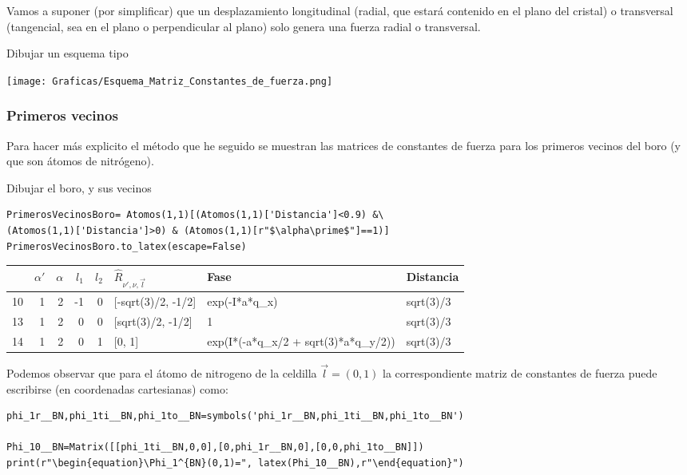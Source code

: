 \documentclass[12pt,a4paper]{article}
\begin{document}
Vamos a suponer (por simplificar) que un desplazamiento longitudinal (radial, que estará contenido en el plano del cristal) o transversal (tangencial, sea en el plano o perpendicular al plano) solo genera una fuerza radial o transversal.

\color{red}
Dibujar un esquema tipo
\begin{center}
\texttt{[image: Graficas/Esquema\_Matriz\_Constantes\_de\_fuerza.png]}
\end{center}
\normalcolor
\subsubsection{Primeros vecinos}
\label{sec:org715612b}
Para hacer más explicito el método que he seguido se muestran las matrices de constantes de fuerza para los primeros vecinos del boro (y que son átomos de nitrógeno).

\color{red} 
Dibujar el boro, y sus vecinos 
\normalcolor

\begin{verbatim}
PrimerosVecinosBoro= Atomos(1,1)[(Atomos(1,1)['Distancia']<0.9) &\
(Atomos(1,1)['Distancia']>0) & (Atomos(1,1)[r"$\alpha\prime$"]==1)]
PrimerosVecinosBoro.to_latex(escape=False)
\end{verbatim}

\begin{tabular}{lrrrrlll}
\toprule
{} &  $\alpha\prime$ &  $\alpha$ &  $l_1$ &  $l_2$ & $\hat R_{\nu\prime,\nu,\vec l}$ &                                 Fase &  Distancia \\
\midrule
10 &               1 &         2 &     -1 &      0 &              [-sqrt(3)/2, -1/2] &                        exp(-I*a*q_x) &  sqrt(3)/3 \\
13 &               1 &         2 &      0 &      0 &               [sqrt(3)/2, -1/2] &                                    1 &  sqrt(3)/3 \\
14 &               1 &         2 &      0 &      1 &                          [0, 1] &  exp(I*(-a*q_x/2 + sqrt(3)*a*q_y/2)) &  sqrt(3)/3 \\
\bottomrule
\end{tabular}

Podemos observar que para el átomo de nitrogeno de la celdilla \(\vec l = (0,1)\) la correspondiente matriz de constantes de fuerza puede escribirse (en coordenadas cartesianas) como:

\begin{verbatim}
phi_1r__BN,phi_1ti__BN,phi_1to__BN=symbols('phi_1r__BN,phi_1ti__BN,phi_1to__BN')

Phi_10__BN=Matrix([[phi_1ti__BN,0,0],[0,phi_1r__BN,0],[0,0,phi_1to__BN]])
print(r"\begin{equation}\Phi_1^{BN}(0,1)=", latex(Phi_10__BN),r"\end{equation}")
\end{verbatim}
\end{document}
